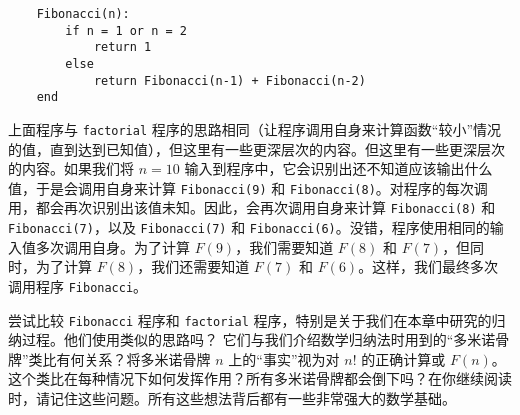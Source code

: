 \begin{verbatim}
    Fibonacci(n):
        if n = 1 or n = 2
            return 1
        else
            return Fibonacci(n-1) + Fibonacci(n-2)
    end
\end{verbatim}

上面程序与 \verb|factorial| 程序的思路相同（让程序调用自身来计算函数``较小''情况的值，直到达到已知值），但这里有一些更深层次的内容。但这里有一些更深层次的内容。如果我们将 $n = 10$ 输入到程序中，它会识别出还不知道应该输出什么值，于是会调用自身来计算 \verb|Fibonacci(9)| 和 \verb|Fibonacci(8)|。对程序的每次调用，都会再次识别出该值未知。因此，会再次调用自身来计算 \verb|Fibonacci(8)| 和 \verb|Fibonacci(7)|，以及 \verb|Fibonacci(7)| 和 \verb|Fibonacci(6)|。没错，程序使用相同的输入值多次调用自身。为了计算 $F(9)$，我们需要知道 $F(8)$ 和 $F(7)$，但同时，为了计算 $F(8)$，我们还需要知道 $F(7) $ 和 $F(6)$。这样，我们最终多次调用程序 \verb|Fibonacci|。

尝试比较 \verb|Fibonacci| 程序和 \verb|factorial| 程序，特别是关于我们在本章中研究的归纳过程。他们使用类似的思路吗？ 它们与我们介绍数学归纳法时用到的``多米诺骨牌''类比有何关系？将多米诺骨牌 $n$ 上的``事实''视为对 $n!$ 的正确计算或 $F(n)$。这个类比在每种情况下如何发挥作用？所有多米诺骨牌都会倒下吗？在你继续阅读时，请记住这些问题。所有这些想法背后都有一些非常强大的数学基础。

\clearpage
